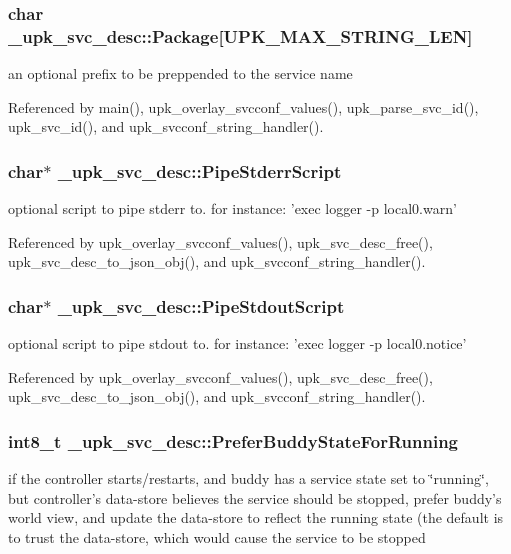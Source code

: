 \subsubsection[{Package}]{\setlength{\rightskip}{0pt plus 5cm}char {\bf \_\-upk\_\-svc\_\-desc::Package}[UPK\_\-MAX\_\-STRING\_\-LEN]}\label{struct__upk__svc__desc_a4e5d439c6426919b8d9270915fe7620a}
an optional prefix to be preppended to the service name 

Referenced by main(), upk\_\-overlay\_\-svcconf\_\-values(), upk\_\-parse\_\-svc\_\-id(), upk\_\-svc\_\-id(), and upk\_\-svcconf\_\-string\_\-handler().

\subsubsection[{PipeStderrScript}]{\setlength{\rightskip}{0pt plus 5cm}char$\ast$ {\bf \_\-upk\_\-svc\_\-desc::PipeStderrScript}}\label{struct__upk__svc__desc_a218ac0c3018977cb3d1e6a6e2ac9b2b4}
optional script to pipe stderr to. for instance: 'exec logger -\/p local0.warn' 

Referenced by upk\_\-overlay\_\-svcconf\_\-values(), upk\_\-svc\_\-desc\_\-free(), upk\_\-svc\_\-desc\_\-to\_\-json\_\-obj(), and upk\_\-svcconf\_\-string\_\-handler().

\subsubsection[{PipeStdoutScript}]{\setlength{\rightskip}{0pt plus 5cm}char$\ast$ {\bf \_\-upk\_\-svc\_\-desc::PipeStdoutScript}}\label{struct__upk__svc__desc_ad9ce631bde035ea74c5f0e98e8dcc90e}
optional script to pipe stdout to. for instance: 'exec logger -\/p local0.notice' 

Referenced by upk\_\-overlay\_\-svcconf\_\-values(), upk\_\-svc\_\-desc\_\-free(), upk\_\-svc\_\-desc\_\-to\_\-json\_\-obj(), and upk\_\-svcconf\_\-string\_\-handler().

\subsubsection[{PreferBuddyStateForRunning}]{\setlength{\rightskip}{0pt plus 5cm}int8\_\-t {\bf \_\-upk\_\-svc\_\-desc::PreferBuddyStateForRunning}}\label{struct__upk__svc__desc_a73d367dc1b45f564243e23297bc39831}
if the controller starts/restarts, and buddy has a service state set to \char`\"{}running\char`\"{}, but controller's data-\/store believes the service should be stopped, prefer buddy's world view, and update the data-\/store to reflect the running state (the default is to trust the data-\/store, which would cause the service to be stopped 

